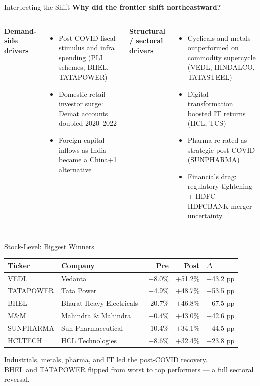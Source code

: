 \documentclass[aspectratio=169]{beamer}
\begin{document}
\begin{frame}{Interpreting the Shift}
  \textbf{Why did the frontier shift northeastward?}

  \begin{columns}[T]
      \textbf{Demand-side drivers}
      \begin{itemize}
        \item Post-COVID fiscal stimulus and infra spending (PLI schemes, BHEL, TATAPOWER)
        \item Domestic retail investor surge: Demat accounts doubled 2020--2022
        \item Foreign capital inflows as India became a China+1 alternative
      \end{itemize}

      \textbf{Structural / sectoral drivers}
      \begin{itemize}
        \item Cyclicals and metals outperformed on commodity supercycle (VEDL, HINDALCO, TATASTEEL)
        \item Digital transformation boosted IT returns (HCL, TCS)
        \item Pharma re-rated as strategic post-COVID (SUNPHARMA)
        \item Financials drag: regulatory tightening + HDFC-HDFCBANK merger uncertainty
      \end{itemize}
  \end{columns}
\end{frame}

\begin{frame}{Stock-Level: Biggest Winners}
  \centering
  \begin{tabular}{llrrl}
    \toprule
    \textbf{Ticker} & \textbf{Company} & \textbf{Pre} & \textbf{Post} & \textbf{$\Delta$} \\
    \midrule
    VEDL      & Vedanta                  & $+$8.0\%  & $+$51.2\% & \textcolor{postcovid}{+43.2 pp} \\
    TATAPOWER & Tata Power               & $-$4.9\%  & $+$48.7\% & \textcolor{postcovid}{+53.5 pp} \\
    BHEL      & Bharat Heavy Electricals & $-$20.7\% & $+$46.8\% & \textcolor{postcovid}{+67.5 pp} \\
    M\&M      & Mahindra \& Mahindra     & $+$0.4\%  & $+$43.0\% & \textcolor{postcovid}{+42.6 pp} \\
    SUNPHARMA & Sun Pharmaceutical       & $-$10.4\% & $+$34.1\% & \textcolor{postcovid}{+44.5 pp} \\
    HCLTECH   & HCL Technologies         & $+$8.6\%  & $+$32.4\% & \textcolor{postcovid}{+23.8 pp} \\
    \bottomrule
  \end{tabular}

  \vspace{0.6em}
  \small Industrials, metals, pharma, and IT led the post-COVID recovery.\\
  BHEL and TATAPOWER flipped from worst to top performers --- a full sectoral reversal.
\end{frame}
\end{document}
